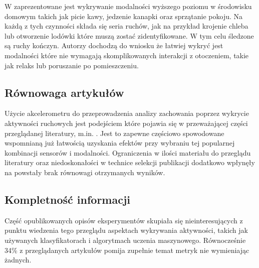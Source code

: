 W \cite{38_High_Lvl_HAR} zaprezentowane jest wykrywanie modalności wyższego poziomu w środowisku domowym takich jak picie kawy, jedzenie kanapki oraz sprzątanie pokoju. Na każdą z tych czynności składa się seria ruchów, jak na przykład krojenie chleba lub otworzenie lodówki które muszą zostać zidentyfikowane. W tym celu śledzone są ruchy kończyn. Autorzy dochodzą do wniosku że łatwiej wykryć jest modalności które nie wymagają skomplikowanych interakcji z otoczeniem, takie jak relaks lub poruszanie po pomieszczeniu.

\subsection{Równowaga artykułów}
Użycie akcelerometru do przeprowadzenia analizy zachowania poprzez wykrycie aktywności ruchowych jest podejściem które pojawia się w przeważającej części przeglądanej literatury, m.in. \cite{59_Air_Pressure_HAR, 33_Inertial_Study, 29_Daily_Sport_HAR, 30_Context_Awareness, 32_Accel_Phone_HAR, 42_Micro_AR}. Jest to zapewne częściowo spowodowane wspomnianą już łatwością uzyskania efektów przy wybraniu tej popularnej kombinacji sensorów i modalności. Ograniczenia w ilości materiału do przeglądu literatury oraz niedoskonałości w technice selekcji publikacji dodatkowo wpłynęły na powstały brak równowagi otrzymanych wyników. 

\subsection{Kompletność informacji}
Część opublikowanych opisów eksperymentów skupiała się nieinteresujących z punktu wiedzenia tego przeglądu aspektach wykrywania aktywności, takich jak używanych klasyfikatorach i algorytmach uczenia maszynowego. Równocześnie 34\% z przeglądanych artykułów pomija zupełnie temat metryk nie wymieniając żadnych.
